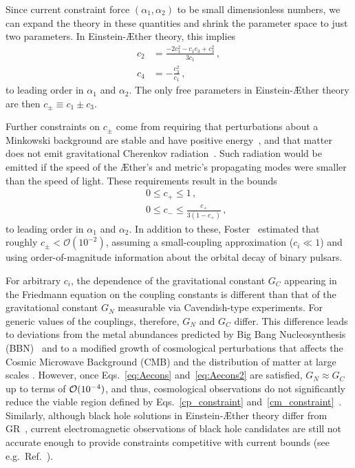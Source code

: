 \documentclass[prd,aps,twocolumn,nofootinbib,showpacs,superscriptaddress]{revtex4-1}
\newcommand\ba{\begin{eqnarray}}
\newcommand\ea{\end{eqnarray}}
\begin{document}
Since current constraint force $(\alpha_{1},\alpha_{2})$ to be small dimensionless numbers, we can 
expand the theory in these quantities and shrink the parameter space to just two parameters. In Einstein-\AE ther theory, 
this implies~\cite{Foster:2005dk,Jacobson:2008aj}
\begin{align}
\label{eq:Aecons}
c_2&=\frac{-2 c_1^2-c_1 c_3+c_3^2}{3 c_1}\,,
\\
\label{eq:Aecons2}
c_4&=-\frac{c_3^2}{c_1}\,,
\end{align}
to leading order in $\alpha_{1}$ and $\alpha_{2}$. The
only free parameters in Einstein-\AE ther theory are then $c_\pm\equiv c_1\pm c_3$.

Further constraints on $c_{\pm}$ come from requiring
that perturbations about a Minkowski background are stable and have
positive energy~\cite{Jacobson:2004ts}, and that matter does not emit
gravitational Cherenkov radiation~\cite{Elliott:2005va}. Such radiation would be emitted if
the speed of the \AE ther's and metric's propagating modes were smaller than the speed of light.  
These requirements result in the bounds
\ba
\label{cp_constraint} &&0\leq c_+\leq 1\,,\\ &&0\leq c_-\leq
\frac{c_+}{3(1-c_+)}\,,\label{cm_constraint} 
\ea 
to leading order in $\alpha_{1}$ and $\alpha_{2}$. In addition to these, 
Foster~\cite{Foster:2007gr} estimated that roughly $c_{\pm} < \mathcal{O}(10^{-2})$, assuming a small-coupling approximation ($c_{i} \ll 1$)
and using order-of-magnitude information about the orbital decay of binary pulsars. 

For arbitrary $c_{i}$, the dependence of the gravitational constant $G_{C}$ appearing in the Friedmann equation 
on the coupling constants is different than that of the gravitational constant $G_{N}$ measurable via Cavendish-type experiments.
For generic values of the couplings, therefore, $G_N$ and $G_C$ differ.
This difference leads to deviations from the metal abundances predicted by Big Bang Nucleosynthesis (BBN)~\cite{Carroll:2004ai} and to a modified growth of cosmological perturbations that affects the Cosmic Microwave Background (CMB) and the distribution of matter at large scales \cite{Audren:2013dwa}. However, 
once Eqs.~\eqref{eq:Aecons} and~\eqref{eq:Aecons2} are satisfied, $G_N \approx G_C$ up to terms of ${\cal{O}}(10^{-4})$, and thus, 
cosmological observations do not significantly reduce the viable
region defined by Eqs.~\eqref{cp_constraint} and~\eqref{cm_constraint}~\cite{Zuntz:2008zz,Jacobson:2008aj}.  
Similarly, although black hole solutions in Einstein-\AE ther theory differ from GR~\cite{Eling:2006ec,Barausse:2011pu,Barausse:2013nwa},
current electromagnetic observations of
black hole candidates are still not accurate enough to provide
constraints competitive with current bounds (see e.g.~Ref.~\cite{Bambi:2011jq}). 
\end{document}
